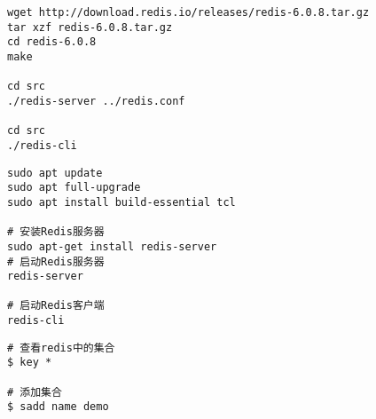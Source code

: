 \documentclass[a4paper]{ctexart}    %
\begin{document}
\begin{tcolorbox}[
         colback=red!5!white,
         colframe=teal,
         title=\textbf{redis install on source code}
    ]
\begin{verbatim}
wget http://download.redis.io/releases/redis-6.0.8.tar.gz
tar xzf redis-6.0.8.tar.gz
cd redis-6.0.8
make

cd src
./redis-server ../redis.conf

cd src
./redis-cli

\end{verbatim}
\end{tcolorbox}

\begin{tcolorbox}[
         colback=red!5!white,
         colframe=teal,
         title=\textbf{redis install on Ubuntu}
    ]
\begin{verbatim}
sudo apt update
sudo apt full-upgrade
sudo apt install build-essential tcl

# 安装Redis服务器
sudo apt-get install redis-server
# 启动Redis服务器
redis-server

# 启动Redis客户端
redis-cli
\end{verbatim}
\end{tcolorbox}

\begin{tcolorbox}[
         colback=red!5!white,
         colframe=teal,
         title=\textbf{Redis order}
    ]
\begin{verbatim}
# 查看redis中的集合
$ key *

# 添加集合
$ sadd name demo
\end{verbatim}
\end{tcolorbox}
\end{document}
